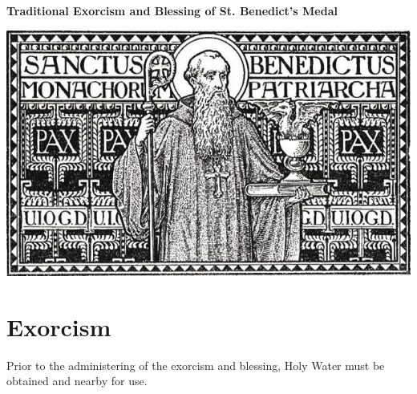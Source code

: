 \documentclass[11pt, twoside]{report}
\begin{document}
\vspace*{4cm}

\begin{center}
	\textbf{\Huge Traditional Exorcism and Blessing of St. Benedict's Medal}\\
\end{center}

\vspace{0.5cm}

\begin{center}
	\includegraphics[width=\textwidth]{StBenedict.jpg}
\end{center}

\vfill\pagebreak


 
\section*{Exorcism}

Prior to the administering of the exorcism and blessing, Holy Water must be obtained and nearby for use.
\end{document}
